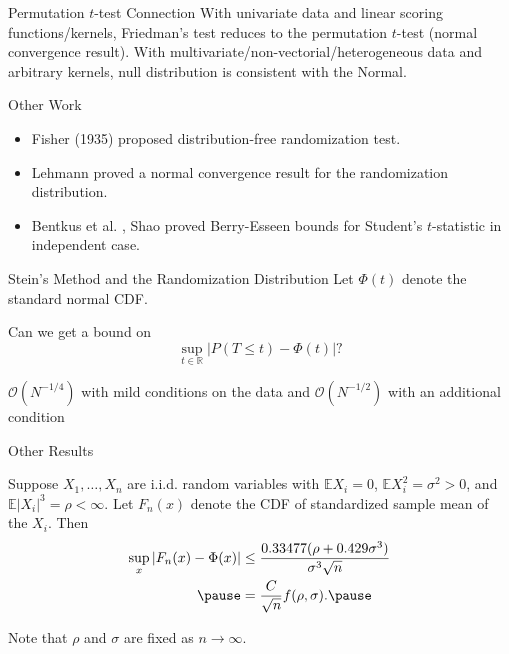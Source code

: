 \documentclass{beamer}
\newcommand{\E}{\mathbb{E}}
\begin{document}
\begin{frame}{Permutation $t$-test Connection}
  With univariate data and linear scoring functions/kernels, Friedman's test reduces
  to the permutation $t$-test (normal convergence result).  \pause
  With multivariate/non-vectorial/heterogeneous data and arbitrary kernels, null distribution
  is consistent with the Normal.
\end{frame}

\begin{frame}{Other Work}
  \begin{itemize}
  \item Fisher (1935) \cite{fisher1935design} proposed distribution-free
    randomization test.  \pause
  \item Lehmann \cite{lehmann1999elements} proved a normal convergence
    result for the randomization distribution. \pause
  \item Bentkus et al. \cite{bentkus1996berry}, Shao
    \cite{shao2005explicit} proved Berry-Esseen bounds for
    Student's $t$-statistic in independent case.
  \end{itemize}
\end{frame}

\begin{frame}{Stein's Method and the Randomization Distribution}
  Let $\Phi(t)$ denote the standard normal CDF.

  Can we get a bound on
  \begin{equation*}
    \sup_{t \in \mathbb{R}} |P(T \leq t) - \Phi(t)|?
  \end{equation*}
  \pause

  $\mathcal{O}(N^{-1/4})$ with mild conditions on the data
  and $\mathcal{O}(N^{-1/2})$ with an additional condition
\end{frame}

\begin{frame}{Other Results}
  \begin{theorem}
  Suppose $X_1, \ldots, X_n$ are i.i.d. random variables with
  $\E X_i = 0$, $\E X_i^2 = \sigma^2 > 0$, and $\E |X_i|^3 = \rho
  < \infty$.  Let $F_n(x)$ denote the CDF of standardized sample mean
  of the $X_i$.  Then
  \begin{align*}
    \sup_x |F_n(x) - \Phi(x)| &\leq \frac{0.33477(\rho + 0.429\sigma^3)}{\sigma^3 \sqrt{n}} \\ \pause
    &= \frac{C}{\sqrt{n}} f(\rho, \sigma). \pause
  \end{align*}
  \end{theorem}
  Note that $\rho$ and $\sigma$ are fixed as $n \to \infty$.
\end{frame}
\end{document}
